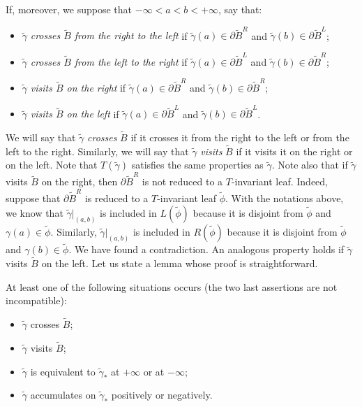 If, moreover, we suppose that $-\infty<a<b<+\infty$, say that:
\begin{itemize}
\item $\tilde\gamma$ \emph{crosses $\tilde B$ from the right to the left }if $\tilde\gamma(a)\in \partial\tilde B^R$ and $\tilde\gamma(b)\in \partial\tilde B^L$;
\item $\tilde\gamma$ \emph{crosses $\tilde B$ from the left to the right} if $\tilde\gamma(a)\in \partial\tilde B^L$ and $\tilde\gamma(b)\in \partial\tilde B^R$;
\item $\tilde\gamma$ \emph{visits $\tilde B$ on the right} if $\tilde\gamma(a)\in \partial\tilde B^R$ and $\tilde\gamma(b)\in \partial\tilde B^R$;
\item $\tilde\gamma$ \emph{visits $\tilde B$ on the left} if $\tilde\gamma(a)\in \partial\tilde B^L$ and $\tilde\gamma(b)\in \partial\tilde B^L$.
\end{itemize}
We will say that $\tilde\gamma$ \emph{crosses} $\tilde B$ if it crosses it from the right to the left or from the left to the right. Similarly, we will say that $\tilde\gamma$ \emph{visits} $\tilde B$ if it visits it on the right or on the left. Note that $T(\tilde\gamma)$ satisfies the same properties as $\tilde\gamma$. Note also that if $\tilde\gamma$ visits $\tilde B$ on the right, then $\partial \tilde B^R$ is not reduced to a $T$-invariant leaf. Indeed, suppose that $\partial \tilde B^R$ is reduced to a $T$-invariant leaf $\tilde\phi$. With the notations above, we know that $\tilde\gamma\vert_{(a,b)}$ is included in $L(\tilde \phi)$ because it is disjoint from $\tilde \phi$ and $\gamma(a)\in \tilde\phi$. Similarly, $\tilde\gamma\vert_{(a,b)}$ is included in $R(\tilde \phi)$ because it is disjoint from $\tilde \phi$ and $\gamma(b)\in \tilde\phi$. We have found a contradiction. An analogous property holds if $\tilde\gamma$ visits $\tilde B$ on the left. Let us state a lemma whose proof is straightforward.

\begin{lemm}\label{Lem4Possib}
At least one of the following situations occurs (the two last assertions are not incompatible):
\begin{itemize}
\item $\tilde\gamma$ crosses $\tilde B$;
\item $\tilde\gamma$ visits $\tilde B$;
\item $\tilde\gamma$ is equivalent to $\tilde \gamma_*$ at $+\infty$ or at $-\infty$;
\item $\tilde\gamma$ accumulates on $\tilde\gamma_*$ positively or negatively.
\end{itemize}
\end{lemm}

